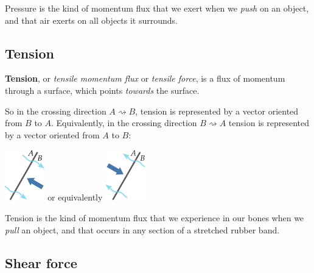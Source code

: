 \documentclass[a4paper,12pt,%
onecolumn,oneside,%
british%
]{memoir}
\providecommand{\href}[2]{#2}
\renewcommand*{\|}[1][]{\nonscript\:#1\vert\nonscript\:\mathopen{}}
\newcommand*{\furl}[2]{\href{#1}{#2}\pagenote{\url{#1}}}
\begin{document}
Pressure is the kind of momentum flux that we exert when we \emph{push} on an object, and that air exerts on all objects it surrounds.

\subsection{Tension}
\label{sec:tension}

\textbf{Tension}, or \emph{tensile momentum flux} or \emph{tensile force}, is a flux of momentum through a surface, which points \emph{towards} the surface.

So in the crossing direction $A\!\rightsquigarrow\!B$, tension is represented by a vector oriented from $B$ to $A$. Equivalently, in the crossing direction $B\!\rightsquigarrow\!A$ tension is represented by a vector oriented from $A$ to $B$:\noprelistbreak
\begin{center}\medskip
  \hspace*{\fill}
  \includegraphics[align=c,height=6em]{images/tension_right.pdf}
  \hfill{\small or equivalently}\hfill
  \includegraphics[align=c,height=6em]{images/tension_left.pdf}
  \hspace*{\fill}
\end{center}

Tension is the kind of momentum flux that we experience in our bones when we \emph{pull} an object, and that occurs in any section of a stretched rubber band.

\subsection{Shear force}
\label{sec:shear}
\end{document}
